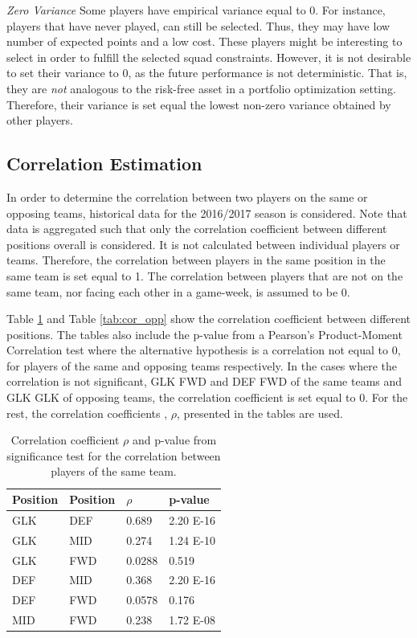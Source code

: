 \textit{Zero Variance}
\newline
Some players have empirical variance equal to 0. For instance, players that have never played, can still be selected. Thus, they may have low number of expected points and a low cost. These players might be interesting to select in order to fulfill the selected squad constraints. However, it is not desirable to set their variance to 0, as the future performance is not deterministic. That is, they are \textit{not} analogous to the risk-free asset in a portfolio optimization setting. Therefore, their variance is set equal the lowest non-zero variance obtained by other players.

\subsection{Correlation Estimation}

In order to determine the correlation between two players on the same or opposing teams, historical data for the 2016/2017 season is considered. Note that data is aggregated such that only the correlation coefficient between different positions overall is considered. It is not calculated between individual players or teams. Therefore, the correlation between players in the same position in the same team is set equal to 1. The correlation between players that are not on the same team, nor facing each other in a game-week, is assumed to be 0.

\newpar

Table \ref{tab:cor_team} and Table \ref{tab:cor_opp} show the correlation coefficient between different positions. The tables also include the p-value from a Pearson's Product-Moment Correlation test where the alternative hypothesis is a correlation not equal to 0, for players of the same and opposing teams respectively. In the cases where the correlation is not significant, GLK FWD and DEF FWD of the same teams and GLK GLK of opposing teams, the correlation coefficient is set equal to 0. For the rest, the correlation coefficients , $\rho$, presented in the tables are used.

\begin{table}[H]
\centering
\begin{tabular}{|l|l|l|l|}
\hline
Position & Position & $\rho$    & p-value  \\
\hline
GLK      & DEF      & 0.689  & 2.20 E-16 \\
GLK      & MID      & 0.274  & 1.24 E-10 \\
GLK      & FWD      & 0.0288 & 0.519    \\
DEF      & MID      & 0.368  & 2.20 E-16 \\
DEF      & FWD      & 0.0578 & 0.176    \\
MID      & FWD      & 0.238  & 1.72 E-08 \\
\hline
\end{tabular}
\caption{Correlation coefficient $\rho$ and p-value from significance test for the correlation between players of the same team.}
\label{tab:cor_team}
\end{table}

